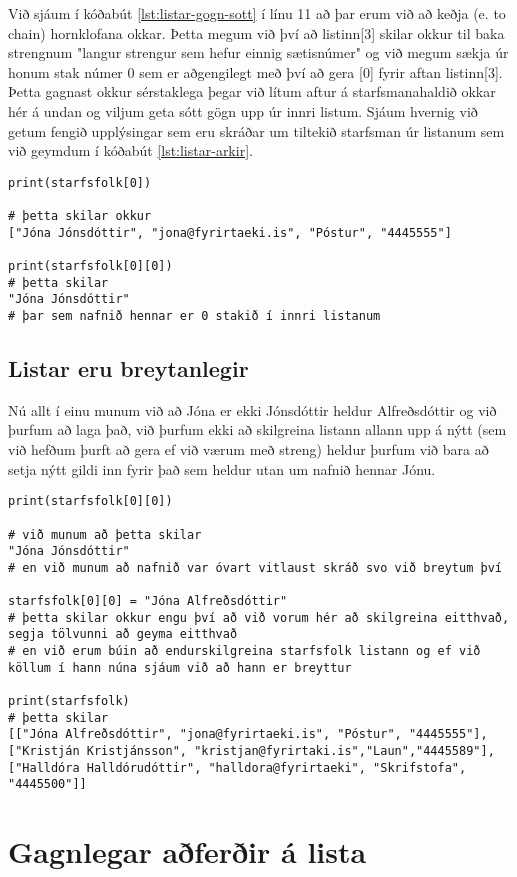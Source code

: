 Við sjáum í kóðabút \ref{lst:listar-gogn-sott} í línu 11 að þar erum við að keðja (e. to chain) hornklofana okkar.
Þetta megum við því að listinn[3] skilar okkur til baka strengnum "langur strengur sem hefur einnig sætisnúmer" og við megum sækja úr honum stak númer 0 sem er aðgengilegt með því að gera [0] fyrir aftan listinn[3].
Þetta gagnast okkur sérstaklega þegar við lítum aftur á starfsmanahaldið okkar hér á undan og viljum geta sótt gögn upp úr innri listum.
Sjáum hvernig við getum fengið upplýsingar sem eru skráðar um tiltekið starfsman úr listanum sem við geymdum í kóðabút \ref{lst:listar-arkir}.

\begin{lstlisting}[caption=Unnið með gögn úr lista, label=lst:listar-gagnanotkun]
print(starfsfolk[0])

# þetta skilar okkur 
["Jóna Jónsdóttir", "jona@fyrirtaeki.is", "Póstur", "4445555"]

print(starfsfolk[0][0])
# þetta skilar
"Jóna Jónsdóttir"
# þar sem nafnið hennar er 0 stakið í innri listanum
\end{lstlisting}

\subsection{Listar eru breytanlegir}
Nú allt í einu munum við að Jóna er ekki Jónsdóttir heldur Alfreðsdóttir og við þurfum að laga það, við þurfum ekki að skilgreina listann allann upp á nýtt (sem við hefðum þurft að gera ef við værum með streng) heldur þurfum við bara að setja nýtt gildi inn fyrir það sem heldur utan um nafnið hennar Jónu.

\begin{lstlisting}[caption=Unnið með gögn úr lista, label=lst:listar-gagnabreyting]
print(starfsfolk[0][0])

# við munum að þetta skilar 
"Jóna Jónsdóttir"
# en við munum að nafnið var óvart vitlaust skráð svo við breytum því

starfsfolk[0][0] = "Jóna Alfreðsdóttir"
# þetta skilar okkur engu því að við vorum hér að skilgreina eitthvað, segja tölvunni að geyma eitthvað
# en við erum búin að endurskilgreina starfsfolk listann og ef við köllum í hann núna sjáum við að hann er breyttur

print(starfsfolk) 
# þetta skilar 
[["Jóna Alfreðsdóttir", "jona@fyrirtaeki.is", "Póstur", "4445555"], ["Kristján Kristjánsson", "kristjan@fyrirtaki.is","Laun","4445589"], ["Halldóra Halldórudóttir", "halldora@fyrirtaeki", "Skrifstofa", "4445500"]]
\end{lstlisting}

\section{Gagnlegar aðferðir á lista}\label{uk:aðferðir-listar}